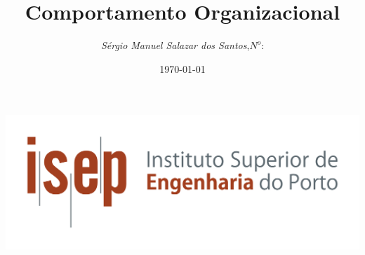 \begin{titlepage}
\begin{minipage}{0.95\linewidth}
\centering
\includegraphics[scale=0.60]{./image/capa/ISEP_marca_cor_grande.png}
\label{Capa}
\title{Comportamento Organizacional}
\author{
\emph{S\'{e}rgio Manuel Salazar dos Santos},\;$N^o$: \\
}
\date{\today}
\maketitle
\end{minipage}
\end{titlepage}